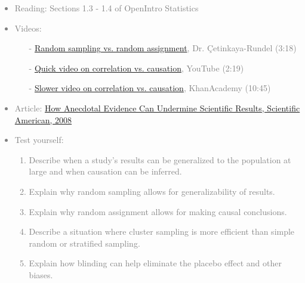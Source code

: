 \documentclass[11pt]{article}
\newcommand{\gray}[1]{\textcolor{gray}{#1}}
\begin{document}
\gray{
{\it
\vspace{-0.75cm}
\begin{itemize}
\renewcommand{\labelitemi}{{\textcolor{dark}{$\ast$}}}
\item Reading: Sections 1.3 - 1.4 of OpenIntro Statistics
\item Videos:
\begin{itemize}
\item[-] \href{http://youtu.be/S6y4QV7Kyl4}{Random sampling vs. random assignment}, Dr. \c{C}etinkaya-Rundel (3:18)
\item[-] \href{http://www.youtube.com/watch?v=5zyruPbgxyM}{Quick video on correlation vs. causation}, YouTube (2:19)
\item[-] \href{http://www.khanacademy.org/math/statistics/v/correlation-and-causality}{Slower video on correlation vs. causation}, KhanAcademy (10:45)
\end{itemize}
\item Article: \href{http://www.scientificamerican.com/article.cfm?id=how-anecdotal-evidence-can-undermine-scientific-results}{How Anecdotal Evidence Can Undermine Scientific Results, Scientific American, 2008}
\item Test yourself: 
\begin{enumerate}
\item Describe when a study's results can be generalized to the population at large and when causation can be inferred.
\item Explain why random sampling allows for generalizability of results.
\item Explain why random assignment allows for making causal conclusions.
\item Describe a situation where cluster sampling is more efficient than simple random or stratified sampling. 
\item Explain how blinding can help eliminate the placebo effect and other biases. \\
\end{enumerate}
\end{itemize}
}}

%
\end{document}
